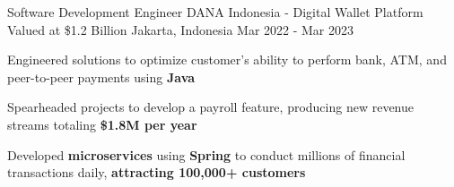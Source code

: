 \begin{cventries}
  \cventry
    {Software Development Engineer} %
    {DANA Indonesia - Digital Wallet Platform Valued at \$1.2 Billion} %
    {Jakarta, Indonesia} %
    {Mar 2022 - Mar 2023} %
    {
      \begin{cvitems} %
        \item {Engineered solutions to optimize customer's ability to perform bank, ATM, and peer-to-peer payments using \textbf{Java}}
        \item {Spearheaded projects to develop a payroll feature, producing new revenue streams totaling \textbf{\$1.8M per year}}
        \item {Developed \textbf{microservices} using \textbf{Spring} to conduct millions of financial transactions daily, \textbf{attracting 100,000+ customers}}
      \end{cvitems}
    }

\end{cventries}
